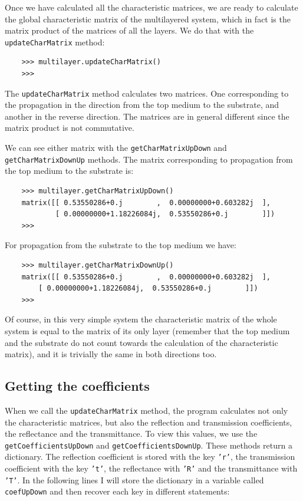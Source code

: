 \documentclass[a4paper,11pt,aps,final]{revtex4}
\begin{document}
Once we have calculated all the characteristic matrices, we are ready to calculate the global characteristic matrix of the multilayered system, which in fact is the matrix product of the matrices of all the layers. We do that with the \texttt{updateCharMatrix} method:

\begin{verbatim}
    >>> multilayer.updateCharMatrix()
    >>>
\end{verbatim}

The \texttt{updateCharMatrix} method calculates two matrices. One corresponding to the propagation in the direction from the top medium to the substrate, and another in the reverse direction. The matrices are in general different since the matrix product is not commutative.

We can see either matrix with the \texttt{getCharMatrixUpDown} and \texttt{getCharMatrixDownUp} methods. The matrix corresponding to propagation from the top medium to the substrate is:

\begin{verbatim}
    >>> multilayer.getCharMatrixUpDown()
    matrix([[ 0.53550286+0.j        ,  0.00000000+0.603282j  ],
            [ 0.00000000+1.18226084j,  0.53550286+0.j        ]])
    >>>
\end{verbatim}

For propagation from the substrate to the top medium we have:

\begin{verbatim}
    >>> multilayer.getCharMatrixDownUp()
    matrix([[ 0.53550286+0.j        ,  0.00000000+0.603282j  ],
        [ 0.00000000+1.18226084j,  0.53550286+0.j        ]])
    >>>
\end{verbatim}

Of course, in this very simple system the characteristic matrix of the whole system is equal to the matrix of its only layer (remember that the top medium and the substrate do not count towards the calculation of the characteristic matrix), and it is trivially the same in both directions too.

\subsection{Getting the coefficients}

When we call the \texttt{updateCharMatrix} method, the program calculates not only the characteristic matrices, but also the reflection and transmission coefficients, the reflectance and the transmittance. To view this values, we use the \texttt{getCoefficientsUpDown} and \texttt{getCoefficientsDownUp}. These methods return a dictionary. The reflection coefficient is stored with the key \texttt{'r'}, the transmission coefficient with the key \texttt{'t'}, the reflectance with \texttt{'R'} and the transmittance with \texttt{'T'}. In the following lines I will store the dictionary in a variable called \texttt{coefUpDown} and then recover each key in different statements:
\end{document}
